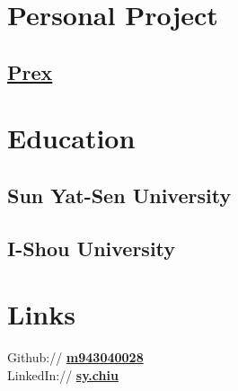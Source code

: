 \documentclass[letterpaper]{deedy-resume} %
\begin{document}
\begin{minipage}[t]{0.33\textwidth}
\sectionspace %

\section{Personal Project} 

\subsection{\href{https://github.com/m943040028/prex}{\bf Prex}}

\sectionspace %

\section{Education}

\subsection{Sun Yat-Sen University}



\subsection{I-Shou University}


\sectionspace %

\section{Links} 

Github:// \href{https://github.com/m943040028}{\bf m943040028} \\
LinkedIn:// \href{http://lnkd.in/Exzyne}{\bf sy.chiu} \\

\sectionspace %


\end{minipage} %
\hfill
%
\end{document}
